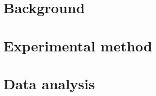 
\part{Background}










\part{Experimental method}



\part{Data analysis}





\printbibliography
\cleardoublepage

\begin{appendices}

\end{appendices}



